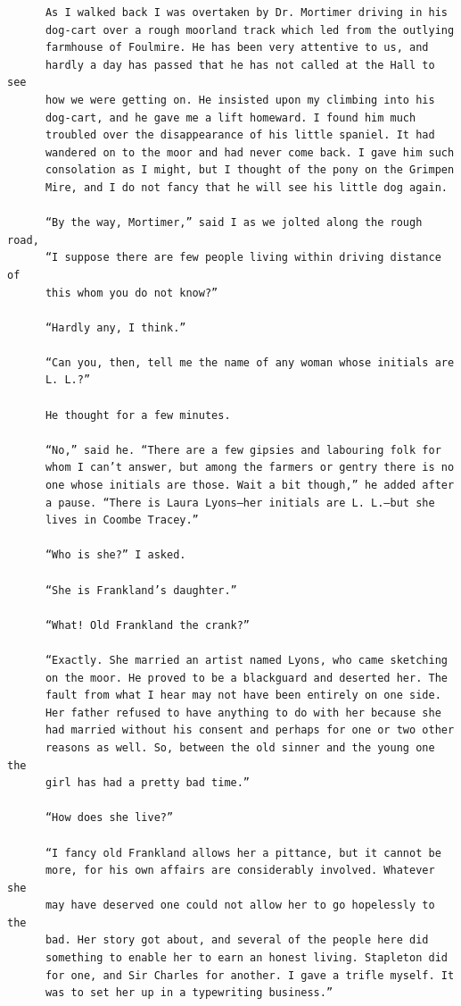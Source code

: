 \documentclass{article}
\begin{document}
\begin{verbatim}
      As I walked back I was overtaken by Dr. Mortimer driving in his
      dog-cart over a rough moorland track which led from the outlying
      farmhouse of Foulmire. He has been very attentive to us, and
      hardly a day has passed that he has not called at the Hall to see
      how we were getting on. He insisted upon my climbing into his
      dog-cart, and he gave me a lift homeward. I found him much
      troubled over the disappearance of his little spaniel. It had
      wandered on to the moor and had never come back. I gave him such
      consolation as I might, but I thought of the pony on the Grimpen
      Mire, and I do not fancy that he will see his little dog again.

      “By the way, Mortimer,” said I as we jolted along the rough road,
      “I suppose there are few people living within driving distance of
      this whom you do not know?”

      “Hardly any, I think.”

      “Can you, then, tell me the name of any woman whose initials are
      L. L.?”

      He thought for a few minutes.

      “No,” said he. “There are a few gipsies and labouring folk for
      whom I can’t answer, but among the farmers or gentry there is no
      one whose initials are those. Wait a bit though,” he added after
      a pause. “There is Laura Lyons—her initials are L. L.—but she
      lives in Coombe Tracey.”

      “Who is she?” I asked.

      “She is Frankland’s daughter.”

      “What! Old Frankland the crank?”

      “Exactly. She married an artist named Lyons, who came sketching
      on the moor. He proved to be a blackguard and deserted her. The
      fault from what I hear may not have been entirely on one side.
      Her father refused to have anything to do with her because she
      had married without his consent and perhaps for one or two other
      reasons as well. So, between the old sinner and the young one the
      girl has had a pretty bad time.”

      “How does she live?”

      “I fancy old Frankland allows her a pittance, but it cannot be
      more, for his own affairs are considerably involved. Whatever she
      may have deserved one could not allow her to go hopelessly to the
      bad. Her story got about, and several of the people here did
      something to enable her to earn an honest living. Stapleton did
      for one, and Sir Charles for another. I gave a trifle myself. It
      was to set her up in a typewriting business.”


\end{verbatim}
\end{document}
